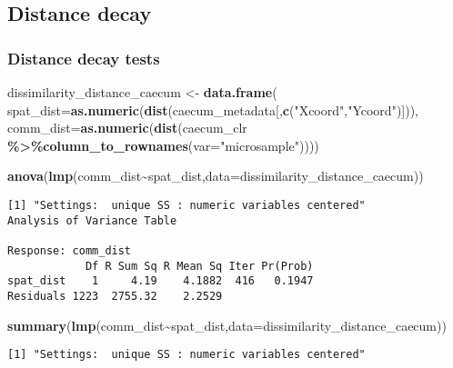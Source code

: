 \documentclass[
]{article}
\newenvironment{Shaded}{\begin{snugshade}}{\end{snugshade}}
\newcommand{\AttributeTok}[1]{\textcolor[rgb]{0.13,0.29,0.53}{#1}}
\newcommand{\FunctionTok}[1]{\textcolor[rgb]{0.13,0.29,0.53}{\textbf{#1}}}
\newcommand{\NormalTok}[1]{#1}
\newcommand{\OtherTok}[1]{\textcolor[rgb]{0.56,0.35,0.01}{#1}}
\newcommand{\SpecialCharTok}[1]{\textcolor[rgb]{0.81,0.36,0.00}{\textbf{#1}}}
\newcommand{\StringTok}[1]{\textcolor[rgb]{0.31,0.60,0.02}{#1}}
\begin{document}
\subsection{Distance decay}\label{distance-decay}

\subsubsection{Distance decay tests}\label{distance-decay-tests}

\begin{Shaded}
\begin{Highlighting}[]
\NormalTok{dissimilarity\_distance\_caecum }\OtherTok{\textless{}{-}} \FunctionTok{data.frame}\NormalTok{(}
        \AttributeTok{spat\_dist=}\FunctionTok{as.numeric}\NormalTok{(}\FunctionTok{dist}\NormalTok{(caecum\_metadata[,}\FunctionTok{c}\NormalTok{(}\StringTok{"Xcoord"}\NormalTok{,}\StringTok{"Ycoord"}\NormalTok{)])),}
        \AttributeTok{comm\_dist=}\FunctionTok{as.numeric}\NormalTok{(}\FunctionTok{dist}\NormalTok{(caecum\_clr }\SpecialCharTok{\%\textgreater{}\%}\FunctionTok{column\_to\_rownames}\NormalTok{(}\AttributeTok{var=}\StringTok{"microsample"}\NormalTok{))))}

\FunctionTok{anova}\NormalTok{(}\FunctionTok{lmp}\NormalTok{(comm\_dist}\SpecialCharTok{\textasciitilde{}}\NormalTok{spat\_dist,}\AttributeTok{data=}\NormalTok{dissimilarity\_distance\_caecum))}
\end{Highlighting}
\end{Shaded}

\begin{verbatim}
[1] "Settings:  unique SS : numeric variables centered"
Analysis of Variance Table

Response: comm_dist
            Df R Sum Sq R Mean Sq Iter Pr(Prob)
spat_dist    1     4.19    4.1882  416   0.1947
Residuals 1223  2755.32    2.2529              
\end{verbatim}

\begin{Shaded}
\begin{Highlighting}[]
\FunctionTok{summary}\NormalTok{(}\FunctionTok{lmp}\NormalTok{(comm\_dist}\SpecialCharTok{\textasciitilde{}}\NormalTok{spat\_dist,}\AttributeTok{data=}\NormalTok{dissimilarity\_distance\_caecum))}
\end{Highlighting}
\end{Shaded}

\begin{verbatim}
[1] "Settings:  unique SS : numeric variables centered"
\end{verbatim}
\end{document}
